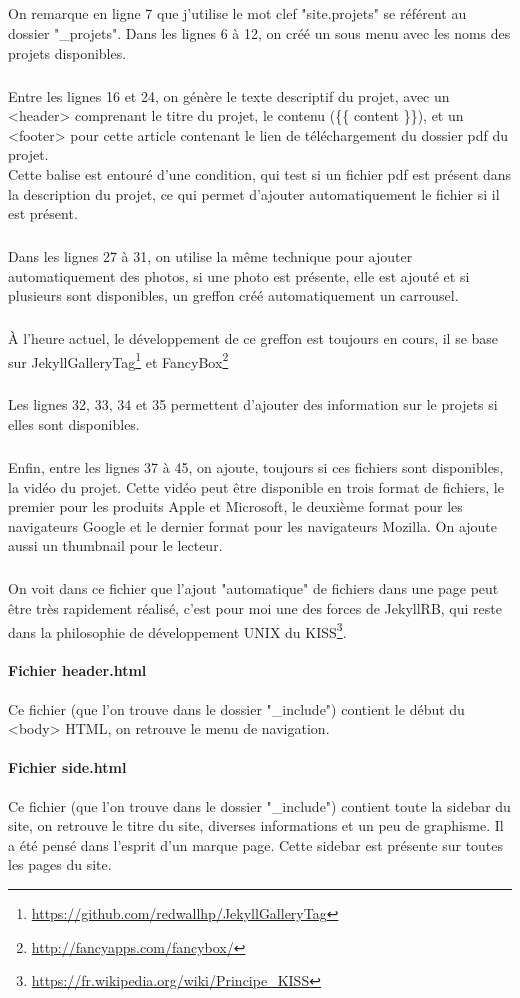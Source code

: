 \documentclass[11pt,a4paper]{report}
\begin{document}
				\subparagraph{}On remarque en ligne 7 que j'utilise le mot clef "site.projets" se référent au dossier "\_projets". Dans les lignes 6 à 12, on créé un sous menu avec les noms des projets disponibles.
				\subparagraph{}Entre les lignes 16 et 24, on génère le texte descriptif du projet, avec un <header> comprenant le titre du projet, le contenu (\{\{ content \}\}), et un <footer> pour cette article contenant le lien de téléchargement du dossier pdf du projet.\\
				Cette balise est entouré d'une condition, qui test si un fichier pdf est présent dans la description du projet, ce qui permet d'ajouter automatiquement le fichier si il est présent.
				\subparagraph{}Dans les lignes 27 à 31, on utilise la même technique pour ajouter automatiquement des photos, si une photo est présente, elle est ajouté et si plusieurs sont disponibles, un greffon créé automatiquement un carrousel.
				\subparagraph{}À l'heure actuel, le développement de ce greffon est toujours en cours, il se base sur JekyllGalleryTag\footnote{\url{https://github.com/redwallhp/JekyllGalleryTag}} et FancyBox\footnote{\url{http://fancyapps.com/fancybox/}}
				\subparagraph{}Les lignes 32, 33, 34 et 35 permettent d'ajouter des information sur le projets si elles sont disponibles.
				\subparagraph{}Enfin, entre les lignes 37 à 45, on ajoute, toujours si ces fichiers sont disponibles, la vidéo du projet. Cette vidéo peut être disponible en trois format de fichiers, le premier pour les produits Apple et Microsoft, le deuxième format pour les navigateurs Google et le dernier format pour les navigateurs Mozilla. On ajoute aussi un thumbnail pour le lecteur.
				\subparagraph{}On voit dans ce fichier que l'ajout "automatique" de fichiers dans une page peut être très rapidement réalisé, c'est pour moi une des forces de JekyllRB, qui reste dans la philosophie de développement UNIX du KISS\footnote{\url{https://fr.wikipedia.org/wiki/Principe_KISS}}.
			\paragraph{Fichier header.html}Ce fichier (que l'on trouve dans le dossier "\_include") contient le début du <body> HTML, on retrouve le menu de navigation.
			\paragraph{Fichier side.html}Ce fichier (que l'on trouve dans le dossier "\_include") contient toute la sidebar du site, on retrouve le titre du site, diverses informations et un peu de graphisme. Il a été pensé dans l'esprit d'un marque page. Cette sidebar est présente sur toutes les pages du site.
\end{document}
